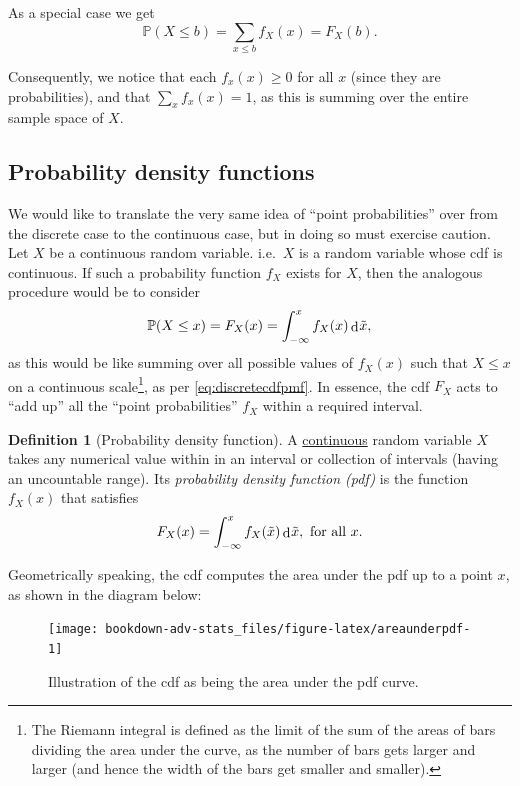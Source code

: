 \documentclass[
]{book}
\newcommand{\bbP}{\mathbb{P}}
\DeclareMathOperator{\dd}{d}
\newcommand{\dint}{\dd\hspace{0.5pt}\!}
\theoremstyle{definition}
\newtheorem{definition}{Definition}[chapter]
\theoremstyle{definition}
\theoremstyle{definition}
\theoremstyle{definition}
\theoremstyle{remark}
\begin{document}
As a special case we get
\begin{equation}
\bbP(X \leq b) = \sum_{x\leq b} f_X(x) = F_X(b). \label{eq:discretecdfpmf}
\end{equation}

Consequently, we notice that each \(f_x(x) \geq 0\) for all \(x\) (since they are probabilities), and that \(\sum_{x} f_x(x) = 1\), as this is summing over the entire sample space of \(X\).

\hypertarget{probability-density-functions}{%
\subsection{Probability density functions}\label{probability-density-functions}}

We would like to translate the very same idea of ``point probabilities'' over from the discrete case to the continuous case, but in doing so must exercise caution.
Let \(X\) be a continuous random variable. i.e.~\(X\) is a random variable whose cdf is continuous.
If such a probability function \(f_X\) exists for \(X\), then the analogous procedure would be to consider
\[
  \bbP(X \leq x) = F_X(x) = \int_{-\infty}^x f_X(x) \dint \tilde x,
\]
as this would be like summing over all possible values of \(f_X(x)\) such that \(X\leq x\) on a continuous scale\footnote{The Riemann integral is defined as the limit of the sum of the areas of bars dividing the area under the curve, as the number of bars gets larger and larger (and hence the width of the bars get smaller and smaller).}, as per \eqref{eq:discretecdfpmf}.
In essence, the cdf \(F_X\) acts to ``add up'' all the ``point probabilities'' \(f_X\) within a required interval.

\begin{definition}[Probability density function]
A \uline{continuous} random variable \(X\) takes any numerical value within in an interval or collection of intervals (having an uncountable range).
Its \emph{probability density function (pdf)} is the function \(f_X(x)\) that satisfies
\[
F_X(x) = \int_{-\infty}^x f_X(\tilde x) \dint \tilde x, \text{ for all } x.
\]
\end{definition}

Geometrically speaking, the cdf computes the area under the pdf up to a point \(x\), as shown in the diagram below:

\begin{figure}

{\centering \texttt{[image: bookdown-adv-stats\_files/figure-latex/areaunderpdf-1]} 

}

\caption{Illustration of the cdf as being the area under the pdf curve.}\label{fig:areaunderpdf}
\end{figure}
\end{document}
